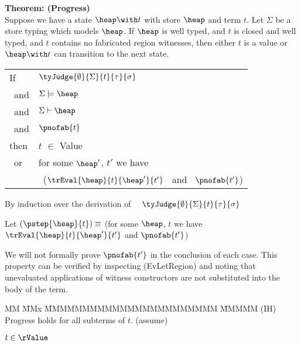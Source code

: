 \clearpage{}
\begin{flushleft}
\textbf{Theorem: (Progress)} \\
Suppose we have a state $\heap \with t$ with store $\heap$ and term $t$. 
Let $\Sigma$ be a store typing which models $\heap$. 
If $\heap$ is well typed, and $t$ is closed and well typed, and $t$ contains no fabricated region witnesses,
then either $t$ is a value or $\heap \with t$ can transition to the next state.

\medskip
\begin{tabular}{ll}
	If 	& $\tyJudge {\emptyset} {\Sigma} {t} {\tau} {\sigma}$  \\
	\ and	& $\Sigma \models \heap$ \\
	\ and	& $\Sigma \vdash  \heap$ \\
	\ and 	& $\pnofab{t}$  
	\\[1ex]
	then	& $t$ $\in$ Value \\
	\ or 	& {for some $\heap'$, $t'$ we have} \\
		& \ ($\trEval {\heap} {t} {\heap'} {t'}$ \ and \ $\pnofab{t'}$) 
\end{tabular}	
		


\bigskip
{} By induction over the derivation of \ \ $\tyJudge {\emptyset} {\Sigma} {t} {\tau} {\sigma}$

Let $(\pstep{\heap}{t}) \equiv$ 
	(for some $\heap$, $t$ we have $\trEval {\heap} {t} {\heap'} {t'}$ and $\pnofab{t'}$)

We will not formally prove $\pnofab{t'}$ in the conclusion of each case. This property
can be verified by inspecting (EvLetRegion) and noting that unevaluated applications
of witness constructors are not substituted into the body of the term.

\begin{tabbing}
MM \= MMx \= MMMMMMMMMMMMMMMMMMMMMMM \= MMMMM  \kill
	\> (IH) 
	\> Progress holds for all subterms of $t$.
	\> (assume) 
\end{tabbing}


\bigskip

\medskip
$t \in \rValue$	
\bigskip


\end{flushleft}

